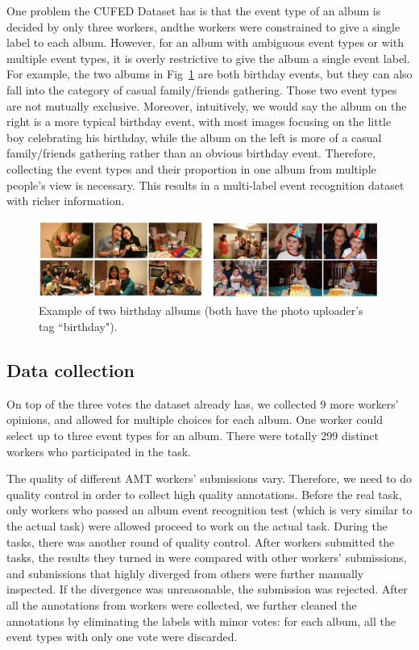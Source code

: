 \documentclass[runningheads]{llncs}
\begin{document}
One problem the CUFED Dataset has is that the event type of an album is decided by only three workers, andthe workers were constrained to give a single label to each album. However, for an album with ambiguous event types or with multiple event types, it is overly restrictive to give the album a single event label. For example, the two albums in Fig~\ref{album} are both birthday events, but they can also fall into the category of casual family/friends gathering. Those two event types are not mutually exclusive. Moreover, intuitively, we would say the album on the right is a more typical birthday event, with most images focusing on the little boy celebrating his birthday, while the album on the left is more of a casual family/friends gathering rather than an obvious birthday event. Therefore, collecting the event types and their proportion in one album from multiple people's view is necessary. This results in a multi-label event recognition dataset with richer information. 
\begin{figure}
\centering
\includegraphics[width=4.5in]{album}
\caption{Example of two birthday albums (both have the photo uploader's tag ``birthday"). }
\label{album}
\vspace{-0.15in}
\end{figure}




\subsection{Data collection}
On top of the three votes the dataset already has, we collected 9 more workers' opinions, and allowed for multiple choices for each album. One worker could select up to three event types for an album. There were totally 299 distinct workers who participated in the task.

The quality of different AMT workers' submissions vary. Therefore, we need to do quality control in order to collect high quality annotations. Before the real task, only workers who passed an album event recognition test (which is very similar to the actual task) were allowed proceed to work on the actual task. During the tasks, there was another round of quality control. After workers submitted the tasks, the results they turned in were compared with other workers' submissions, and submissions that highly diverged from others were further manually inspected. If the divergence was unreasonable, the submission was rejected. After all the annotations from workers were collected, we further cleaned the annotations by eliminating the labels with minor votes: for each album, all the event types with only one vote were discarded. 
\end{document}
